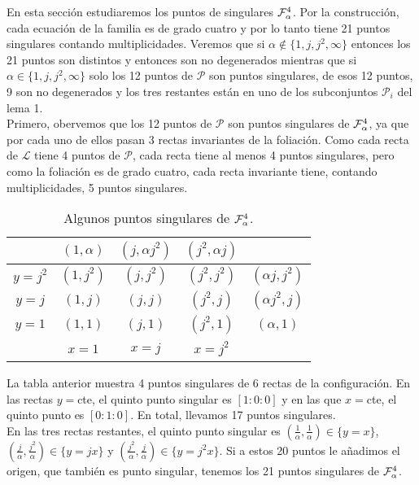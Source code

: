 En esta sección estudiaremos los puntos de singulares $\Fol[4]{\alpha}$. Por la construcción, cada ecuación de la familia es de grado cuatro y por lo tanto tiene 21 puntos singulares contando multiplicidades. Veremos que si $\alpha\notin \{1,j,j^{2},\infty \}$ entonces los 21 puntos son distintos y entonces son no degenerados mientras que si  $\alpha\in \{1,j,j^{2},\infty \}$ solo los 12 puntos de $\mathcal{P}$ son puntos singulares, de esos 12 puntos, 9 son no degenerados y los tres restantes están en uno de los subconjuntos $\mathcal{P}_{i}$ del lema 1.
\\

Primero, obervemos que los 12 puntos de $\mathcal{P}$ son puntos singulares de $\Fol[4]{\alpha}$, ya que por cada uno de ellos pasan 3 rectas invariantes de la foliación. Como cada recta de $\mathcal{L}$ tiene 4 puntos de $\mathcal{P}$, cada recta tiene al menos 4 puntos singulares, pero como la foliación es de grado cuatro, cada recta invariante tiene, contando multiplicidades, 5 puntos singulares.\\


\begin{table}[h]
\begin{center}
  \begin{tabular}{c|c|c|c|c}
    \ & $(1,\alpha)$ & $(j,\alpha j^{2})$ & $(j^{2},\alpha j)$ & \  \\ \hline 
    $y=j^{2}$ & $(1,j^{2})$ & $(j,j^{2})$ & $(j^{2},j^{2})$ & $(\alpha j,j^{2})$ \\ \hline 
    $y=j$ & $(1,j)$ & $(j,j)$ & $(j^{2},j)$ & $(\alpha j^{2},j)$ \\ \hline 
    $y=1$ & $(1,1)$ & $(j,1)$ & $(j^{2},1)$ & $(\alpha ,1)$ \\ \hline 
    \ & $x=1$ & $x=j$ & $x=j^{2}$ & \ \\
  \end{tabular}
  \caption{Algunos puntos singulares de $\Fol[4]{\alpha}$.}
  \label{Tab:PuntSingGrad4}
\end{center}  
\end{table}


La tabla anterior muestra 4 puntos singulares de 6 rectas de la configuración. En las rectas $y=$cte, el quinto punto singular es $[1 : 0 : 0]$ y en las que $x=$cte, el quinto punto es $[0 : 1 : 0]$. En total, llevamos 17 puntos singulares.
\\

En las tres rectas restantes, el quinto punto singular es $(\frac{1}{\alpha},\frac{1}{\alpha})\in\{ y=x \}$, $(\frac{j}{\alpha}, \frac{j^{2}}{\alpha})\in\{ y=jx \}$ y $(\frac{j^{2}}{\alpha}, \frac{j}{\alpha})\in\{ y=j^{2}x \}$. Si a estos 20 puntos le añadimos el origen, que también es punto singular, tenemos los 21 puntos singulares de $\Fol[4]{\alpha}$.\\

